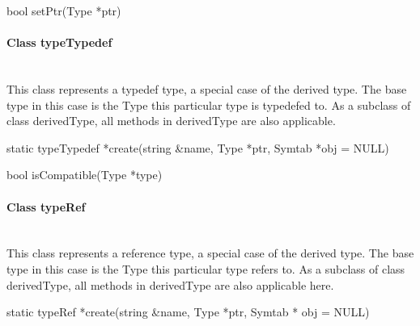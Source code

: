 \begin{apient}
bool setPtr(Type *ptr)
\end{apient}

\paragraph{Class typeTypedef}
\mbox{ }\\

This class represents a typedef type, a special case of the derived type. The base type in this case is the Type this particular type is typedefed to. As a subclass of class derivedType, all methods in derivedType are also applicable.


\begin{apient}
static typeTypedef *create(string &name, Type *ptr, 
                            Symtab *obj = NULL) 
\end{apient}

\begin{apient}
bool isCompatible(Type *type)
\end{apient}

\paragraph{Class typeRef }
\mbox{ }\\

This class represents a reference type, a special case of the derived type. The base type in this case is the Type this particular type refers to. As a subclass of class derivedType, all methods in derivedType are also applicable here. 


\begin{apient}
static typeRef *create(string &name, Type *ptr, Symtab * obj = NULL)
\end{apient}

